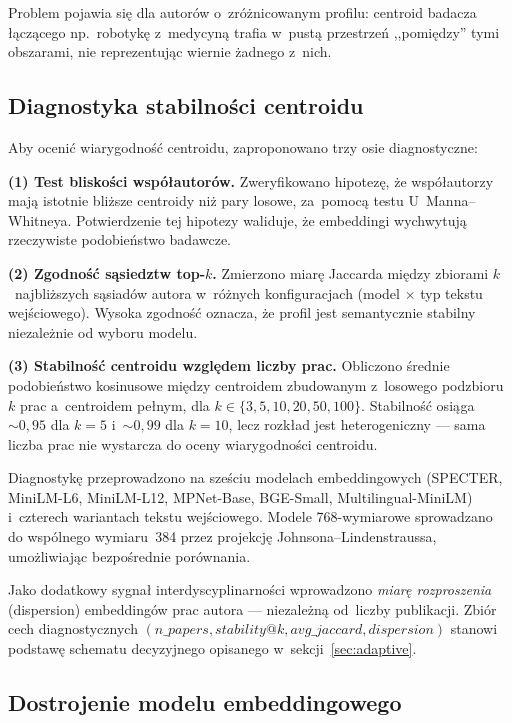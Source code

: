 \documentclass[a4paper,11pt,twocolumn]{article}
\begin{document}
Problem pojawia się dla autorów o~zróżnicowanym profilu: centroid
badacza łączącego np.~robotykę z~medycyną trafia w~pustą przestrzeń
,,pomiędzy'' tymi obszarami, nie reprezentując wiernie żadnego z~nich.

\subsection{Diagnostyka stabilności centroidu}

Aby ocenić wiarygodność centroidu, zaproponowano trzy osie diagnostyczne:

\textbf{(1) Test bliskości współautorów.}
Zweryfikowano hipotezę, że współautorzy mają istotnie bliższe centroidy
niż pary losowe, za~pomocą testu U~Manna--Whitneya. Potwierdzenie
tej hipotezy waliduje, że embeddingi wychwytują rzeczywiste podobieństwo
badawcze.

\textbf{(2) Zgodność sąsiedztw top-$k$.}
Zmierzono miarę Jaccarda między zbiorami $k$~najbliższych sąsiadów
autora w~różnych konfiguracjach (model $\times$ typ tekstu wejściowego).
Wysoka zgodność oznacza, że profil jest semantycznie stabilny niezależnie
od wyboru modelu.

\textbf{(3) Stabilność centroidu względem liczby prac.}
Obliczono średnie podobieństwo kosinusowe między centroidem zbudowanym
z~losowego podzbioru $k$ prac a~centroidem pełnym, dla
$k \in \{3, 5, 10, 20, 50, 100\}$. Stabilność osiąga $\sim\!0{,}95$
dla $k=5$ i~$\sim\!0{,}99$ dla $k=10$, lecz rozkład jest heterogeniczny
--- sama liczba prac nie wystarcza do oceny wiarygodności centroidu.

Diagnostykę przeprowadzono na sześciu modelach embeddingowych (SPECTER,
MiniLM-L6, MiniLM-L12, MPNet-Base, BGE-Small, Multilingual-MiniLM)
i~czterech wariantach tekstu wejściowego. Modele 768-wymiarowe
sprowadzano do wspólnego wymiaru~384 przez projekcję
Johnsona--Lindenstraussa, umożliwiając bezpośrednie porównania.

Jako dodatkowy sygnał interdyscyplinarności wprowadzono \emph{miarę
rozproszenia} (dispersion) embeddingów prac autora --- niezależną
od~liczby publikacji. Zbiór cech diagnostycznych
$(n\_papers, stability@k, avg\_jaccard, dispersion)$ stanowi podstawę
schematu decyzyjnego opisanego w~sekcji~\ref{sec:adaptive}.


\subsection{Dostrojenie modelu embeddingowego}
\label{sec:finetune}
\end{document}
